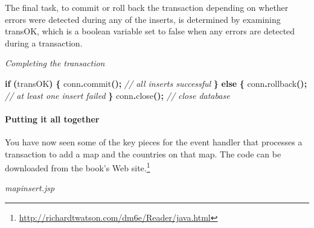 \documentclass[
]{article}
\newenvironment{Shaded}{\begin{snugshade}}{\end{snugshade}}
\newcommand{\CommentTok}[1]{\textcolor[rgb]{0.56,0.35,0.01}{\textit{#1}}}
\newcommand{\ControlFlowTok}[1]{\textcolor[rgb]{0.13,0.29,0.53}{\textbf{#1}}}
\newcommand{\FunctionTok}[1]{\textcolor[rgb]{0.00,0.00,0.00}{#1}}
\newcommand{\NormalTok}[1]{#1}
\newcommand{\OperatorTok}[1]{\textcolor[rgb]{0.81,0.36,0.00}{\textbf{#1}}}
\begin{document}
The final task, to commit or roll back the transaction depending on
whether errors were detected during any of the inserts, is determined by
examining transOK, which is a boolean variable set to false when any
errors are detected during a transaction.

\emph{Completing the transaction}

\begin{Shaded}
\begin{Highlighting}[]
\ControlFlowTok{if} \OperatorTok{(}\NormalTok{transOK}\OperatorTok{)} \OperatorTok{\{}
\NormalTok{    conn}\OperatorTok{.}\FunctionTok{commit}\OperatorTok{();} \CommentTok{// all inserts successful}
\OperatorTok{\}} \ControlFlowTok{else} \OperatorTok{\{}
\NormalTok{    conn}\OperatorTok{.}\FunctionTok{rollback}\OperatorTok{();} \CommentTok{// at least one insert failed}
\OperatorTok{\}}
\NormalTok{conn}\OperatorTok{.}\FunctionTok{close}\OperatorTok{();} \CommentTok{// close database}
\end{Highlighting}
\end{Shaded}

\hypertarget{putting-it-all-together}{%
\paragraph*{Putting it all together}\label{putting-it-all-together}}

You have now seen some of the key pieces for the event handler that
processes a transaction to add a map and the countries on that map. The
code can be downloaded from the book's Web site.\footnote{\url{http://richardtwatson.com/dm6e/Reader/java.html}}

\emph{mapinsert.jsp}
\end{document}
